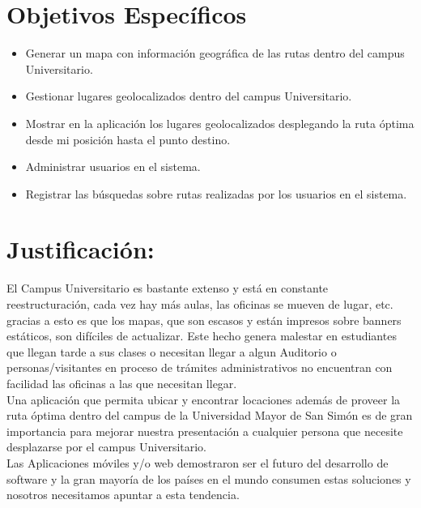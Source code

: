   \section{Objetivos Específicos} %
  \label{sec:obj_especificos}
    \begin{itemize}
      \item Generar un mapa con información geográfica de las rutas dentro del campus Universitario.
      \item Gestionar lugares geolocalizados dentro del campus Universitario.
      \item Mostrar en la aplicación los lugares geolocalizados desplegando la ruta óptima desde mi posición hasta el punto destino.
      \item Administrar usuarios en el sistema.
      \item Registrar las búsquedas sobre rutas realizadas por los usuarios en el sistema.
    \end{itemize}


  \section{Justificación:} %
  \label{sec:justificacion}
  El Campus Universitario es bastante extenso y está en constante reestructuración, cada vez hay más aulas, las oficinas se mueven de lugar, etc. gracias a esto es que los mapas, que son escasos y están impresos sobre banners estáticos, son difíciles de actualizar. Este hecho genera malestar en estudiantes que llegan tarde a sus clases o necesitan llegar a algun Auditorio o personas/visitantes en proceso de trámites administrativos no encuentran con facilidad las oficinas a las que necesitan llegar.\\


  Una aplicación que permita ubicar y encontrar locaciones además de proveer la ruta óptima dentro del campus de la Universidad Mayor de San Simón es de gran importancia para mejorar nuestra presentación a cualquier persona que necesite desplazarse por el campus Universitario.\\


  Las Aplicaciones móviles y/o web demostraron ser el futuro del desarrollo de software y la gran mayoría de los países en el mundo consumen estas soluciones y nosotros necesitamos apuntar a esta tendencia.\\



